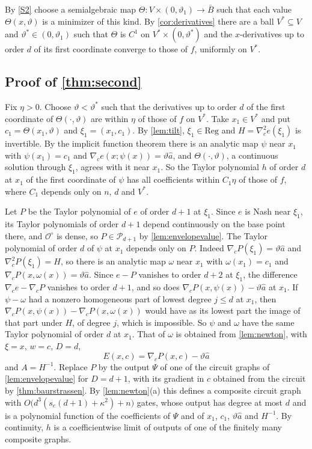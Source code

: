 By \ref{S2} choose a semialgebraic map $\Theta\colon V\times(0,\vartheta_1)\to\bar B$ such that each value $\Theta(x,\vartheta)$ is a minimizer of this kind. By \cref{cor:derivatives} there are a ball $V^*\subseteq V$ and $\vartheta^*\in(0,\vartheta_1)$ such that $\Theta$ is $C^1$ on $V^*\times(0,\vartheta^*)$ and the $x$-derivatives up to order $d$ of its first coordinate converge to those of $f$, uniformly on $V^*$.

\subsection{Proof of \texorpdfstring{\cref{thm:second}}{the theorem}}

Fix $\eta>0$. Choose $\vartheta<\vartheta^*$ such that the derivatives up to order $d$ of the first coordinate of $\Theta(\cdot,\vartheta)$ are within $\eta$ of those of $f$ on $V^*$. Take $x_1\in V^*$ and put $c_1=\Theta(x_1,\vartheta)$ and $\xi_1=(x_1,c_1)$. By \cref{lem:tilt}, $\xi_1\in\mathrm{Reg}$ and $H=\nabla_c^2e(\xi_1)$ is invertible. By the implicit function theorem there is an analytic map $\psi$ near $x_1$ with $\psi(x_1)=c_1$ and $\nabla_ce(x;\psi(x))=\vartheta\hat a$, and $\Theta(\cdot,\vartheta)$, a continuous solution through $\xi_1$, agrees with it near $x_1$. So the Taylor polynomial $h$ of order $d$ at $x_1$ of the first coordinate of $\psi$ has all coefficients within $C_1\eta$ of those of $f$, where $C_1$ depends only on $n$, $d$ and $V^*$.

Let $P$ be the Taylor polynomial of $e$ of order $d+1$ at $\xi_1$. Since $e$ is Nash near $\xi_1$, its Taylor polynomials of order $d+1$ depend continuously on the base point there, and $\mathcal O^\circ$ is dense, so $P\in\mathcal P_{d+1}$ by \cref{lem:envelopevalue}. The Taylor polynomial of order $d$ of $\psi$ at $x_1$ depends only on $P$. Indeed $\nabla_cP(\xi_1)=\vartheta\hat a$ and $\nabla_c^2P(\xi_1)=H$, so there is an analytic map $\omega$ near $x_1$ with $\omega(x_1)=c_1$ and $\nabla_cP(x,\omega(x))=\vartheta\hat a$. Since $e-P$ vanishes to order $d+2$ at $\xi_1$, the difference $\nabla_ce-\nabla_cP$ vanishes to order $d+1$, and so does $\nabla_cP(x,\psi(x))-\vartheta\hat a$ at $x_1$. If $\psi-\omega$ had a nonzero homogeneous part of lowest degree $j\le d$ at $x_1$, then $\nabla_cP(x,\psi(x))-\nabla_cP(x,\omega(x))$ would have as its lowest part the image of that part under $H$, of degree $j$, which is impossible. So $\psi$ and $\omega$ have the same Taylor polynomial of order $d$ at $x_1$. That of $\omega$ is obtained from \cref{lem:newton}, with $\xi=x$, $w=c$, $D=d$,
\[
E(x,c)=\nabla_cP(x,c)-\vartheta\hat a
\]
and $A=H^{-1}$. Replace $P$ by the output $\Psi$ of one of the circuit graphs of \cref{lem:envelopevalue} for $D=d+1$, with its gradient in $c$ obtained from the circuit by \cref{thm:baurstrassen}. By \cref{lem:newton}(a) this defines a composite circuit graph with $O\bigl(d^3(s_e(d+1)+\kappa^2)+n\bigr)$ gates, whose output has degree at most $d$ and is a polynomial function of the coefficients of $\Psi$ and of $x_1$, $c_1$, $\vartheta\hat a$ and $H^{-1}$. By continuity, $h$ is a coefficientwise limit of outputs of one of the finitely many composite graphs.

